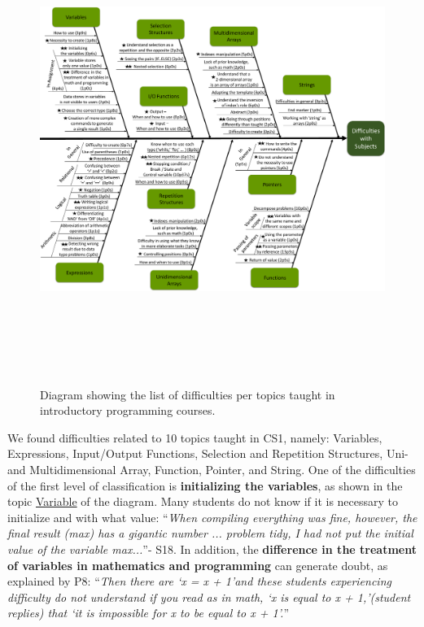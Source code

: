 \documentclass[sigconf]{acmart}
\begin{document}
\begin{figure}
\includegraphics[height=6in, width=7in]{Difficulties1}
\caption{Diagram showing the list of difficulties per topics taught in introductory programming courses.}
\label{fig:Difficulties}
\end{figure}

We found difficulties related to 10 topics taught in CS1, namely: Variables, Expressions, Input/Output Functions, Selection and Repetition Structures, Uni- and Multidimensional Array, Function, Pointer, and String. One of the difficulties of the first level of classification is \textbf{initializing the variables}, as shown in the topic \underline{Variable} of the diagram. Many students do not know if it is necessary to initialize and with what value: \textquotedblleft \textit{When compiling everything was fine, however, the final result (max) has a gigantic number ... problem tidy, I had not put the initial value of the variable max...}\textquotedblright \space - S18. In addition, the \textbf{difference in the treatment of variables in mathematics and programming} can generate doubt, as explained by P8: \textquotedblleft \textit{Then there are \textquoteleft{x = x + 1}\textquoteright \space and these students experiencing difficulty do not understand if you read as in math, \textquoteleft{x is equal to x + 1,}\textquoteright \space (student replies) that \textquoteleft{it is impossible for x to be equal to x + 1}\textquoteright.}\textquotedblright
\end{document}

